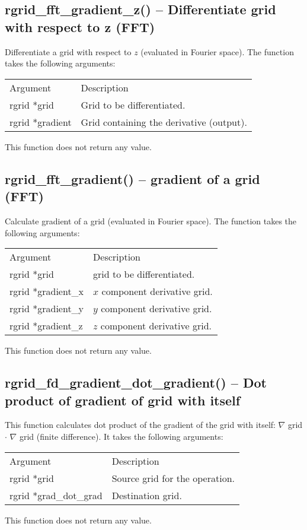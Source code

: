 \documentclass[12pt,letterpaper]{report}
\begin{document}
\subsection{rgrid\_fft\_gradient\_z() -- Differentiate grid with respect to z (FFT)}

Differentiate a grid with respect to $z$ (evaluated in Fourier space). The function takes the following arguments:
\begin{longtable}{p{} p{}}
Argument & Description\\
\cline{1-2}
rgrid *grid & Grid to be differentiated.\\
rgrid *gradient & Grid containing the derivative (output).\\
\end{longtable}
\noindent
This function does not return any value.

\subsection{rgrid\_fft\_gradient() -- gradient of a grid (FFT)}

Calculate gradient of a grid (evaluated in Fourier space). The function takes the following arguments:
\begin{longtable}{p{} p{}}
Argument & Description\\
\cline{1-2}
rgrid *grid & grid to be differentiated.\\
rgrid *gradient\_x & $x$ component derivative grid.\\
rgrid *gradient\_y & $y$ component derivative grid.\\
rgrid *gradient\_z & $z$ component derivative grid.\\
\end{longtable}
\noindent
This function does not return any value.

\subsection{rgrid\_fd\_gradient\_dot\_gradient() -- Dot product of gradient of grid with itself}

This function calculates dot product of the gradient of the grid with itself: $\nabla$ grid $\cdot$ $\nabla$ grid (finite difference). It takes the following arguments:
\begin{longtable}{p{} p{}}
Argument & Description\\
\cline{1-2}
rgrid *grid  & Source grid for the operation.\\
rgrid *grad\_dot\_grad & Destination grid.\\
\end{longtable}
\noindent
This function does not return any value.
\end{document}
